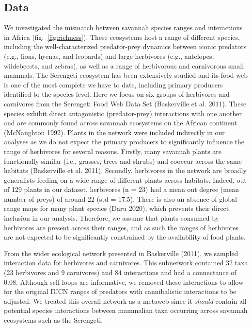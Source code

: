 \documentclass[10pt,oneside]{article}
\begin{document}
\hypertarget{data}{%
\subsection{Data}\label{data}}

We investigated the mismatch between savannah species ranges and
interactions in Africa (fig.~\ref{fig:richness}). These ecosystems host
a range of different species, including the well-characterized
predator-prey dynamics between iconic predators (e.g., lions, hyenas,
and leopards) and large herbivores (e.g., antelopes, wildebeests, and
zebras), as well as a range of herbivorous and carnivorous small
mammals. The Serengeti ecosystem has been extensively studied and its
food web is one of the most complete we have to date, including primary
producers identified to the species level. Here we focus on six groups
of herbivores and carnivores from the Serengeti Food Web Data Set
(Baskerville et al. 2011). These species exhibit direct antagonistic
(predator-prey) interactions with one another and are commonly found
across savannah ecosystems on the African continent (McNaughton 1992).
Plants in the network were included indirectly in our analyses as we do
not expect the primary producers to significantly influence the range of
herbivores for several reasons. Firstly, many savannah plants are
functionally similar (i.e., grasses, trees and shrubs) and cooccur
across the same habitats (Baskerville et al. 2011). Secondly, herbivores
in the network are broadly generalists feeding on a wide range of
different plants across habitats. Indeed, out of 129 plants in our
dataset, herbivores (n = 23) had a mean out degree (mean number of
preys) of around 22 (std = 17.5). There is also an absence of global
range maps for many plant species (Daru 2020), which prevents their
direct inclusion in our analysis. Therefore, we assume that plants
consumed by herbivores are present across their ranges, and as such the
ranges of herbivores are not expected to be significantly constrained by
the availability of food plants.

From the wider ecological network presented in Baskerville (2011), we
sampled interaction data for herbivores and carnivores. This subnetwork
contained 32 taxa (23 herbivores and 9 carnivores) and 84 interactions
and had a connectance of 0.08. Although self-loops are informative, we
removed these interactions to allow for the original IUCN ranges of
predators with cannibalistic interactions to be adjusted. We treated
this overall network as a metaweb since it \emph{should} contain all
potential species interactions between mammalian taxa occurring across
savannah ecosystems such as the Serengeti.
\end{document}
